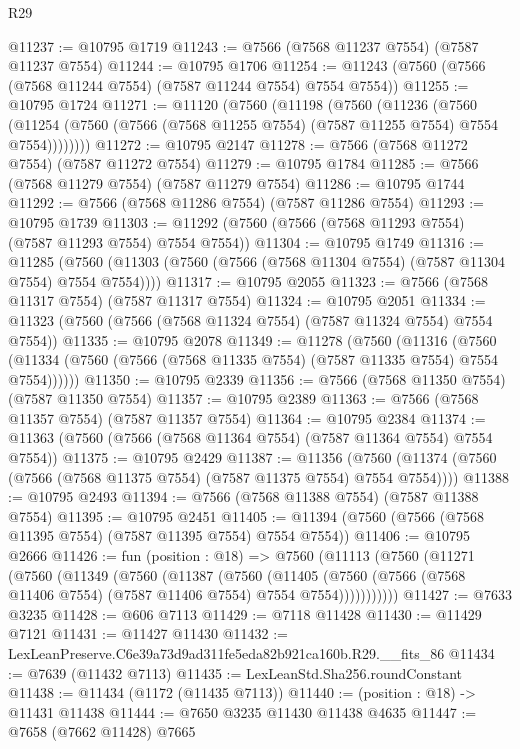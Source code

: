 \begin{lexlean}{R29}
\begin{coremodule}
@11237 := @10795 @1719
@11243 := @7566 (@7568 @11237 @7554) (@7587 @11237 @7554)
@11244 := @10795 @1706
@11254 := @11243 (@7560 (@7566 (@7568 @11244 @7554) (@7587 @11244 @7554) @7554 @7554))
@11255 := @10795 @1724
@11271 := @11120
    (@7560
      (@11198
        (@7560
          (@11236
            (@7560
              (@11254 (@7560 (@7566 (@7568 @11255 @7554) (@7587 @11255 @7554) @7554 @7554))))))))
@11272 := @10795 @2147
@11278 := @7566 (@7568 @11272 @7554) (@7587 @11272 @7554)
@11279 := @10795 @1784
@11285 := @7566 (@7568 @11279 @7554) (@7587 @11279 @7554)
@11286 := @10795 @1744
@11292 := @7566 (@7568 @11286 @7554) (@7587 @11286 @7554)
@11293 := @10795 @1739
@11303 := @11292 (@7560 (@7566 (@7568 @11293 @7554) (@7587 @11293 @7554) @7554 @7554))
@11304 := @10795 @1749
@11316 := @11285
    (@7560 (@11303 (@7560 (@7566 (@7568 @11304 @7554) (@7587 @11304 @7554) @7554 @7554))))
@11317 := @10795 @2055
@11323 := @7566 (@7568 @11317 @7554) (@7587 @11317 @7554)
@11324 := @10795 @2051
@11334 := @11323 (@7560 (@7566 (@7568 @11324 @7554) (@7587 @11324 @7554) @7554 @7554))
@11335 := @10795 @2078
@11349 := @11278
    (@7560
      (@11316
        (@7560 (@11334 (@7560 (@7566 (@7568 @11335 @7554) (@7587 @11335 @7554) @7554 @7554))))))
@11350 := @10795 @2339
@11356 := @7566 (@7568 @11350 @7554) (@7587 @11350 @7554)
@11357 := @10795 @2389
@11363 := @7566 (@7568 @11357 @7554) (@7587 @11357 @7554)
@11364 := @10795 @2384
@11374 := @11363 (@7560 (@7566 (@7568 @11364 @7554) (@7587 @11364 @7554) @7554 @7554))
@11375 := @10795 @2429
@11387 := @11356
    (@7560 (@11374 (@7560 (@7566 (@7568 @11375 @7554) (@7587 @11375 @7554) @7554 @7554))))
@11388 := @10795 @2493
@11394 := @7566 (@7568 @11388 @7554) (@7587 @11388 @7554)
@11395 := @10795 @2451
@11405 := @11394 (@7560 (@7566 (@7568 @11395 @7554) (@7587 @11395 @7554) @7554 @7554))
@11406 := @10795 @2666
@11426 := fun (position : @18) =>
  @7560
    (@11113
      (@7560
        (@11271
          (@7560
            (@11349
              (@7560
                (@11387
                  (@7560
                    (@11405
                      (@7560 (@7566 (@7568 @11406 @7554) (@7587 @11406 @7554) @7554 @7554)))))))))))
@11427 := @7633 @3235
@11428 := @606 @7113
@11429 := @7118 @11428
@11430 := @11429 @7121
@11431 := @11427 @11430
@11432 := LexLeanPreserve.C6e39a73d9ad311fe5eda82b921ca160b.R29.__fits_86
@11434 := @7639 (@11432 @7113)
@11435 := LexLeanStd.Sha256.roundConstant
@11438 := @11434 (@1172 (@11435 @7113))
@11440 := (position : @18) -> @11431 @11438
@11444 := @7650 @3235 @11430 @11438 @4635
@11447 := @7658 (@7662 @11428) @7665

\end{coremodule}
\end{lexlean}
